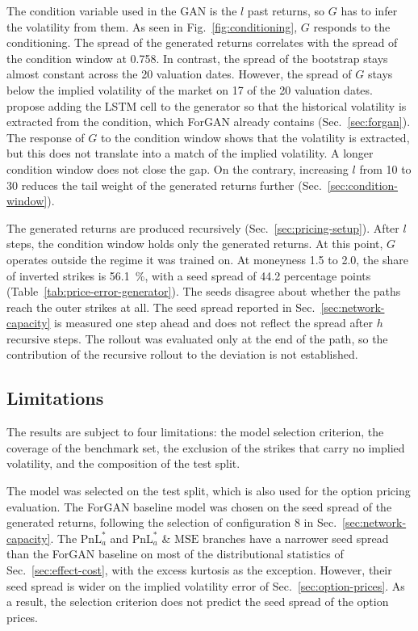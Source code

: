The condition variable used in the GAN is the $l$ past returns, so $G$ has to infer the volatility from them. As seen in Fig.~\ref{fig:conditioning}, $G$ responds to the conditioning. The spread of the generated returns correlates with the spread of the condition window at \num{0.758}. In contrast, the spread of the bootstrap stays almost constant across the \num{20} valuation dates. However, the spread of $G$ stays below the implied volatility of the market on \num{17} of the \num{20} valuation dates. \textcite{fuTimeSeriesSimulation2019} propose adding the LSTM cell to the generator so that the historical volatility is extracted from the condition, which ForGAN already contains (Sec.~\ref{sec:forgan}). The response of $G$ to the condition window shows that the volatility is extracted, but this does not translate into a match of the implied volatility. A longer condition window does not close the gap. On the contrary, increasing $l$ from \num{10} to \num{30} reduces the tail weight of the generated returns further (Sec.~\ref{sec:condition-window}). 

The generated returns are produced recursively (Sec.~\ref{sec:pricing-setup}). After $l$ steps, the condition window holds only the generated returns. At this point, $G$ operates outside the regime it was trained on. At moneyness \num{1.5} to \num{2.0}, the share of inverted strikes is \SI{56.1}{\percent}, with a seed spread of \num{44.2} percentage points (Table~\ref{tab:price-error-generator}). The seeds disagree about whether the paths reach the outer strikes at all. The seed spread reported in Sec.~\ref{sec:network-capacity} is measured one step ahead and does not reflect the spread after $h$ recursive steps. The rollout was evaluated only at the end of the path, so the contribution of the recursive rollout to the deviation is not established.

\subsection{Limitations}\label{sec:limitations}

The results are subject to four limitations: the model selection criterion, the coverage of the benchmark set, the exclusion of the strikes that carry no implied volatility, and the composition of the test split.

The model was selected on the test split, which is also used for the option pricing evaluation. The ForGAN baseline model was chosen on the seed spread of the generated returns, following the selection of configuration 8 in Sec.~\ref{sec:network-capacity}. The $\mathrm{PnL}^{*}_{a}$ and $\mathrm{PnL}^{*}_{a}$ \& $\mathrm{MSE}$ branches have a narrower seed spread than the ForGAN baseline on most of the distributional statistics of Sec.~\ref{sec:effect-cost}, with the excess kurtosis as the exception. However, their seed spread is wider on the implied volatility error of Sec.~\ref{sec:option-prices}. As a result, the selection criterion does not predict the seed spread of the option prices.

